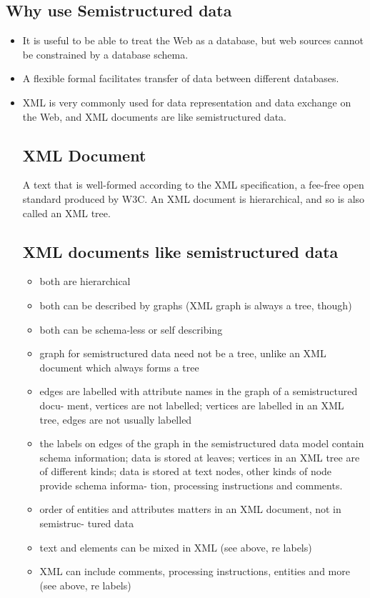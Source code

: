 \documentclass[10pt]{article}
\begin{document}
        \subsection*{Why use Semistructured data}
        \begin{itemize}
            \item It is useful to be able to treat the Web as a database, but web sources cannot be constrained by a database schema.
            \item A flexible formal facilitates transfer of data between different databases.
            \item XML is very commonly used for data representation and data exchange on the Web, and XML documents are like semistructured data.
        
        \subsection*{XML Document}
        A text that is well-formed according to the XML specification, a fee-free open standard produced by W3C. An XML document is hierarchical, and so is also called an XML tree.
        \subsection*{XML documents like semistructured data}
            \begin{itemize}
                \item both are hierarchical
                \item both can be described by graphs (XML graph is always a tree, though) 
                \item both can be schema-less or self describing
                \item graph for semistructured data need not be a tree, unlike an XML document which always forms a tree
                \item edges are labelled with attribute names in the graph of a semistructured docu- ment, vertices are not labelled; vertices are labelled in an XML tree, edges are not usually labelled
                \item the labels on edges of the graph in the semistructured data model contain schema information; data is stored at leaves; vertices in an XML tree are of different kinds; data is stored at text nodes, other kinds of node provide schema informa- tion, processing instructions and comments.
                \item order of entities and attributes matters in an XML document, not in semistruc- tured data
                \item text and elements can be mixed in XML (see above, re labels)
                \item XML can include comments, processing instructions, entities and more (see above, re labels)
        \end{itemize}


\end{itemize}
\end{document}
